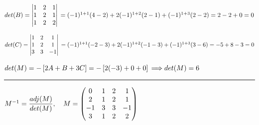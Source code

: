 \documentclass[fleqn]{article}
\begin{document}
\begin{enumerate}
      \bigbreak

      \textcolor{hwColor}{
        $
        det(B)=\begin{vmatrix}
          1 & 2 & 1 \\ 
          1 & 2 & 1 \\
          1 & 2 & 2 \\
        \end{vmatrix} \\
        =(-1)^{1+1}(4-2)+2(-1)^{1+2}(2-1)+(-1)^{1+3}(2-2)=2-2+0=0
        $
      }

      \bigbreak

      \textcolor{hwColor}{
        $
        det(C)=\begin{vmatrix}
          1 & 2 & 1 \\ 
          1 & 2 & 1 \\
          3 & 3 & -1 \\
        \end{vmatrix} \\
        =(-1)^{1+1}(-2-3)+2(-1)^{1+2}(-1-3)+(-1)^{1+3}(3-6)=-5+8-3=0
        $
      }

      \bigbreak

      \textcolor{hwColor}{
        $
          det(M)=-\left[2A+B+3C\right]=-\left[2(-3)+0+0\right] \\
          \Longrightarrow det(M)=6
        $
      }

      \rule{16cm}{0.4pt}

      \textcolor{hwColor}{
        $
          M^{-1}= \dfrac{adj(M)}{det(M)}, ~~~
          M=\begin{pmatrix}
            0 & 1 & 2 & 1 \\
            2 & 1 & 2 & 1 \\
            -1 & 3 & 3 & -1 \\
            3 & 1 & 2 & 2 \\
          \end{pmatrix} \\
        $
      }


\end{enumerate}
\end{document}
